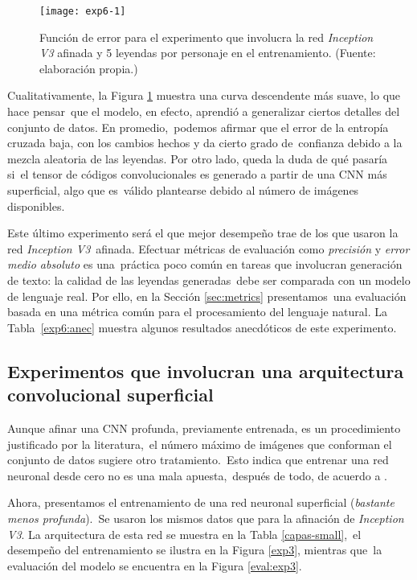 \begin{figure}[H]
  \texttt{[image: exp6-1]}
  \caption{
    Función de error para el experimento que involucra la red \emph{Inception V3}
    afinada y 5 leyendas por personaje en el entrenamiento.
    (Fuente: elaboración propia.)
  }
  \label{exp6}
\end{figure}

Cualitativamente, la Figura \ref{exp6} muestra una curva descendente más suave, lo que hace pensar\
que el modelo, en efecto, aprendió a generalizar ciertos detalles del conjunto de datos. En promedio,\
podemos afirmar que el error de la entropía cruzada baja, con los cambios hechos y da cierto grado de\
confianza debido a la mezcla aleatoria de las leyendas. Por otro lado, queda la duda de qué pasaría si\
el tensor de códigos convolucionales es generado a partir de una CNN más superficial, algo que es\
válido plantearse debido al número de imágenes disponibles.\par
Este último experimento será el que mejor desempeño trae de los que usaron la red \emph{Inception V3}\
afinada. Efectuar métricas de evaluación como \emph{precisión} y \emph{error medio absoluto} es una\
práctica poco común en tareas que involucran generación de texto: la calidad de las leyendas generadas\
debe ser comparada con un modelo de lenguaje real. Por ello, en la Sección \ref{sec:metrics} presentamos\
una evaluación basada en una métrica común para el procesamiento del lenguaje natural. La Tabla\
\ref{exp6:anec} muestra algunos resultados anecdóticos de este experimento.

\subsection{Experimentos que involucran una arquitectura convolucional superficial}

\noindent
Aunque afinar una CNN profunda, previamente entrenada, es un procedimiento justificado por la literatura,\
el número máximo de imágenes que conforman el conjunto de datos sugiere otro tratamiento.\
Esto indica que entrenar una red neuronal desde cero no es una mala apuesta,\
después de todo, de acuerdo a \cite{DBLP:journals/corr/YosinskiCBL14}.\par
Ahora, presentamos el entrenamiento de una red neuronal superficial (\emph{bastante menos profunda}).\
Se usaron los mismos datos que para la afinación de \emph{Inception V3}.
La arquitectura de esta red se muestra en la Tabla \ref{capas-small},\
el desempeño del entrenamiento se ilustra en la Figura \ref{exp3}, mientras que\
la evaluación del modelo se encuentra en la Figura \ref{eval:exp3}.

